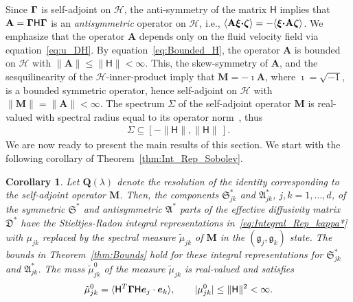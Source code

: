 \documentclass[english,12pt,jmp,graphicx]{revtex4-1}
\newcommand{\vecxi}{\boldsymbol{\xi}}
\newcommand{\veczeta}{\boldsymbol{\zeta}}
\newcommand{\vecg}{\mathfrak{g}}
\newcommand{\vece}{\boldsymbol{e}}
\newcommand{\thmref}[1]{Theorem~\ref{#1}}
\newcommand{\bGamma}{\mbox{\boldmath${\Gamma}$}}
\newcommand{\bcdot}{\mbox{\boldmath${\cdot}$}}
\newcommand{\Sg}{\mathfrak{S}}
\newcommand{\Ag}{\mathfrak{A}}
\newcommand{\Dg}{\mathfrak{D}}
\newcommand{\Hc}{\mathcal{H}}
\newtheorem{corollary}[theorem]{Corollary}
\newcommand{\Real}{\mbox{Re}\,}
\newcommand{\Imag}{\mbox{Im}\,}
\newcommand{\Hm}{\mathsf{H}}
\newcommand{\Mb}{\mathbf{M}}
\newcommand{\Ab}{\mathbf{A}}
\newcommand{\Qb}{\mathbf{Q}}
\begin{document}
 Since $\bGamma$ is self-adjoint on $\Hc$, the anti-symmetry of
the matrix $\Hm$ implies that $\Ab=\bGamma\Hm\bGamma$ is an
\emph{antisymmetric} operator on $\Hc$, i.e.,   
$\langle\Ab\vecxi\bcdot\veczeta\rangle=-\langle\vecxi\bcdot\Ab\veczeta\rangle$.
We emphasize that the operator $\Ab$ depends
only on the fluid velocity field via equation~\eqref{eq:u_DH}. By
equation~\eqref{eq:Bounded_H}, the 
operator $\Ab$ is bounded on $\Hc$ with $\|\Ab\|\leq\|\Hm\|<\infty$. This, the
skew-symmetry of $\Ab$, and the sesquilinearity of the
$\Hc$-inner-product imply that $\Mb=-\imath\Ab$, where $\imath=\sqrt{-1}$, is a
bounded symmetric  operator, hence
self-adjoint on $\Hc$ with $\|\Mb\|=\|\Ab\|<\infty$. The spectrum
$\Sigma$ of the self-adjoint operator $\Mb$ is real-valued with spectral
radius equal to its operator norm~\cite{Reed-1980}, thus
%
\begin{align}\label{eq:Spectral_Radius}
  \Sigma\subseteq[-\|\Hm\|,\|\Hm\|\,].
\end{align}
%
We are now ready to present the main results of this section. 
We start with the following corollary of \thmref{thm:Int_Rep_Sobolev}.


%
\begin{corollary}\label{cor:Int_Rep}
%
Let $\Qb(\lambda)$ denote the resolution of the identity corresponding
to the self-adjoint operator $\Mb$. Then, the components $\Sg^*_{jk}$
and $\Ag^*_{jk}$, 
$j,k=1,\ldots,d$, of the symmetric $\Sg^*$ and antisymmetric $\Ag^*$
parts of the effective diffusivity matrix $\Dg^*$ have the 
Stieltjes-Radon integral representations in~\eqref{eq:Integral_Rep_kappa*} with 
$\mu_{jk}$ replaced by the spectral measure $\tilde{\mu}_{jk}$ of
$\Mb$ in the $(\vecg_j,\vecg_k)$ state.
The bounds in \thmref{thm:Bounds} hold for these integral
representations for $\Sg^*_{jk}$ and $\Ag^*_{jk}$.
The mass $\tilde{\mu}^0_{jk}$ of 
the measure $\tilde{\mu}_{jk}$ is real-valued and satisfies
%
\begin{align}\label{eq:Mass}
  \tilde{\mu}^0_{jk}=\langle\Hm^T\bGamma\Hm\vece_j\cdot\vece_k\rangle,
        \qquad
        |\mu^0_{jk}|\leq\|\Hm\|^2<\infty.
\end{align}
%
%  
\end{corollary}
\end{document}
